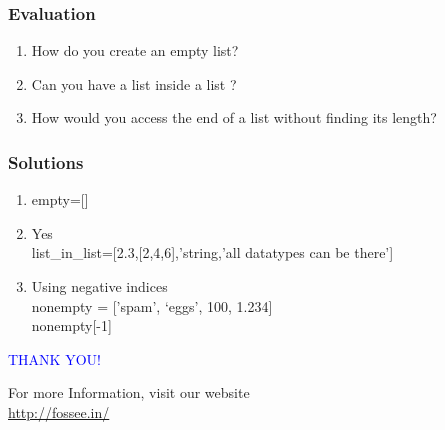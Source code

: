 \documentclass[presentation]{beamer}
\begin{document}
\begin{frame}
\frametitle{Evaluation}
\label{sec-9}


\begin{enumerate}
\item How do you create an empty list?
\vspace{8pt}
\item Can you have a list inside a list ?
\vspace{8pt}
\item How would you access the end of a list without finding its length?
\end{enumerate}
\end{frame}
\begin{frame}
\frametitle{Solutions}
\label{sec-10}


\begin{enumerate}
\item empty=[]
\vspace{8pt}
\item Yes\\
list\_in\_list=[2.3,[2,4,6],'string,'all datatypes can be there']
\vspace{8pt}
\item Using negative indices\\
nonempty = ['spam', `eggs', 100, 1.234]\\
     nonempty[-1]
\end{enumerate}
\end{frame}
\begin{frame}

 \begin{block}{}
  \begin{center}
  \textcolor{blue}{\Large THANK YOU!} 
  \end{center}
  \end{block}
\begin{block}{}
  \begin{center}
    For more Information, visit our website\\
    \url{http://fossee.in/}
  \end{center}  
  \end{block}
\end{frame}
\end{document}
